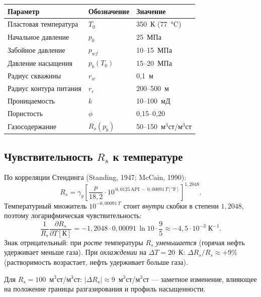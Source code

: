 ﻿\documentclass[12pt,a4paper]{article}
\begin{document}
\begin{center}
\begin{tabular}{lll}
\hline
Параметр & Обозначение & Значение \\
\hline
Пластовая температура & $T_0$ & 350~К ($77$~°C) \\
Начальное давление & $p_0$ & 25~МПа \\
Забойное давление & $p_{wf}$ & 10--15~МПа \\
Давление насыщения & $p_b(T_0)$ & 15--20~МПа \\
Радиус скважины & $r_w$ & 0{,}1~м \\
Радиус контура питания & $r_e$ & 200--500~м \\
Проницаемость & $k$ & 10--100~мД \\
Пористость & $\phi$ & 0{,}15--0{,}20 \\
Газосодержание & $R_s(p_b)$ & 50--150~м$^3$ст/м$^3$ст \\
\hline
\end{tabular}
\end{center}

\subsection{Чувствительность $R_s$ к температуре}\label{ssec:Rs_T}

По корреляции Стендинга (Standing, 1947; McCain, 1990):
\begin{equation}\label{eq:Rs_Standing}
  R_s = \gamma_g\left[
    \frac{p}{18{,}2}\cdot
    10^{\,0{,}0125\,\text{API}\,-\,0{,}00091\,T[\text{°F}]}
  \right]^{1{,}2048}.
\end{equation}
Температурный множитель $10^{-0{,}00091\,T}$ стоит \emph{внутри}
скобки в степени $1{,}2048$, поэтому логарифмическая
чувствительность:
\begin{equation}\label{eq:dRsdT}
  \frac{1}{R_s}\frac{\partial R_s}{\partial T[\text{К}]}
  = -1{,}2048 \cdot 0{,}00091\,\ln 10 \cdot \frac{9}{5}
  \approx -4{,}5 \cdot 10^{-3}\;\text{К}^{-1}.
\end{equation}
Знак отрицательный: при \emph{росте} температуры $R_s$
\emph{уменьшается} (горячая нефть удерживает меньше газа).
При \emph{охлаждении} на $\Delta T = 20$~К:
$\Delta R_s / R_s \approx +9\%$
(растворимость возрастает, нефть удерживает больше газа).

Для $R_s = 100$~м$^3$ст/м$^3$ст: $|\Delta R_s| \approx 9$~м$^3$ст/м$^3$ст
--- заметное изменение, влияющее на положение границы
разгазирования и профиль насыщенности.
\end{document}
